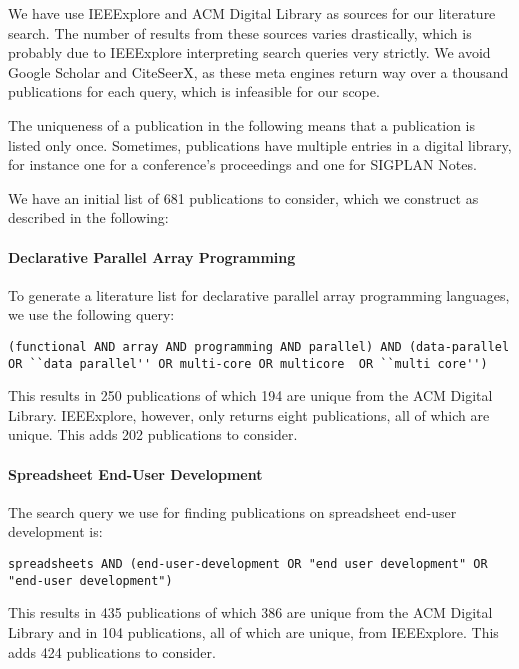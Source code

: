 \documentclass[a4paper]{article}
\begin{document}
We have use IEEExplore and ACM Digital Library as sources for our
literature search. The number of results from these sources varies
drastically, which is probably due to IEEExplore interpreting search
queries very strictly. We avoid Google Scholar and CiteSeerX, as these
meta engines return way over a thousand publications for each query,
which is infeasible for our scope.

The uniqueness of a publication in the following means that a
publication is listed only once. Sometimes, publications have multiple
entries in a digital library, for instance one for a conference's
proceedings and one for SIGPLAN Notes.

We have an initial list of 681 publications to consider, which we
construct as described in the following:

\paragraph{Declarative Parallel Array Programming}

To generate a literature list for declarative parallel array
programming languages, we use the following query:

\begin{lstlisting}
(functional AND array AND programming AND parallel) AND (data-parallel OR ``data parallel'' OR multi-core OR multicore  OR ``multi core'')
\end{lstlisting}

\noindent This results in 250 publications of which 194 are unique from the ACM
Digital Library. IEEExplore, however, only returns eight publications,
all of which are unique. This adds 202 publications to consider.

\paragraph{Spreadsheet End-User Development}

The search query we use for finding publications on spreadsheet
end-user development is:

\begin{lstlisting}
spreadsheets AND (end-user-development OR "end user development" OR "end-user development")
\end{lstlisting}

\noindent This results in 435 publications of which 386 are unique from the ACM
Digital Library and in 104 publications, all of which are unique, from
IEEExplore. This adds 424 publications to consider.
\end{document}

